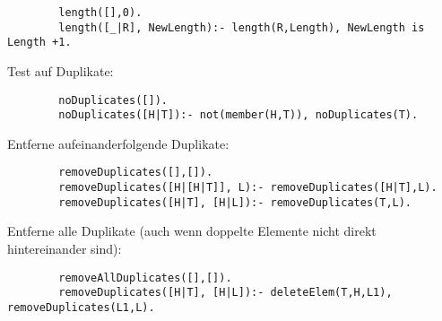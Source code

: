 \begin{compactitem}
		\begin{lstlisting}
		length([],0).
		length([_|R], NewLength):- length(R,Length), NewLength is Length +1.
		\end{lstlisting}
	\item Test auf Duplikate:
		\begin{lstlisting}
		noDuplicates([]).
		noDuplicates([H|T]):- not(member(H,T)), noDuplicates(T).
		\end{lstlisting}
	\item Entferne aufeinanderfolgende Duplikate:
		\begin{lstlisting}
		removeDuplicates([],[]).
		removeDuplicates([H|[H|T]], L):- removeDuplicates([H|T],L).
		removeDuplicates([H|T], [H|L]):- removeDuplicates(T,L).
		\end{lstlisting}
	\item Entferne alle Duplikate (auch wenn doppelte Elemente nicht direkt hintereinander sind):
		\begin{lstlisting}
		removeAllDuplicates([],[]).
		removeDuplicates([H|T], [H|L]):- deleteElem(T,H,L1), removeDuplicates(L1,L).
		\end{lstlisting}
\end{compactitem}